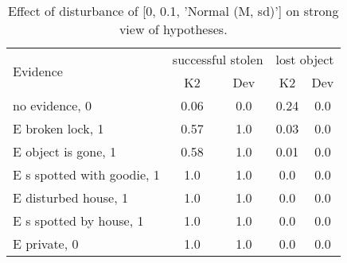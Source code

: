 \begin{table}\begin{tabular}{l|cc|cc}\toprule\multirow{2}{*}{Evidence} & \multicolumn{2}{c}{successful stolen}& \multicolumn{2}{c}{lost object}\\& {K2} & {Dev}& {K2} & {Dev}\\\midrule
no evidence, 0 & \cellcolor{Bittersweet}0.06&\cellcolor{Bittersweet}0.0&\cellcolor{Bittersweet}0.24&\cellcolor{Bittersweet}0.0\\E broken lock, 1 & 0.57&1.0&\cellcolor{Bittersweet}0.03&\cellcolor{Bittersweet}0.0\\E object is gone, 1 & 0.58&1.0&\cellcolor{Bittersweet}0.01&\cellcolor{Bittersweet}0.0\\E s spotted with goodie, 1 & \cellcolor{Bittersweet}1.0&\cellcolor{Bittersweet}1.0&\cellcolor{Bittersweet}0.0&\cellcolor{Bittersweet}0.0\\E disturbed house, 1 & \cellcolor{Bittersweet}1.0&\cellcolor{Bittersweet}1.0&\cellcolor{Bittersweet}0.0&\cellcolor{Bittersweet}0.0\\E s spotted by house, 1 & \cellcolor{Bittersweet}1.0&\cellcolor{Bittersweet}1.0&\cellcolor{Bittersweet}0.0&\cellcolor{Bittersweet}0.0\\E private, 0 & \cellcolor{Bittersweet}1.0&\cellcolor{Bittersweet}1.0&\cellcolor{Bittersweet}0.0&\cellcolor{Bittersweet}0.0\\\bottomrule\end{tabular}\caption{Effect of disturbance of [0, 0.1, 'Normal (M, sd)'] on strong view of hypotheses.}\end{table}